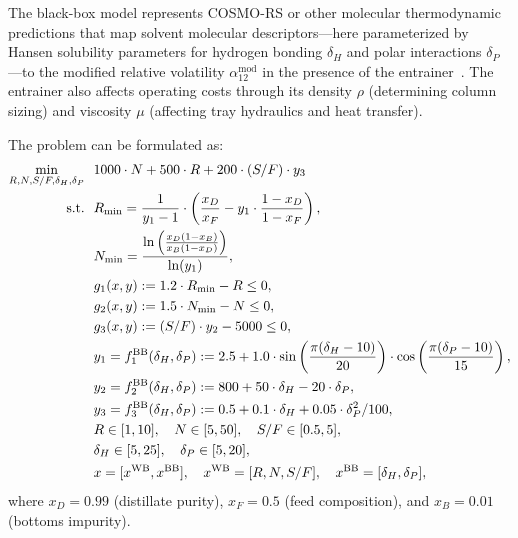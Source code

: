 \documentclass[12pt,a4paper]{article}%
\theoremstyle{plain}%
\theoremstyle{remark}%
\theoremstyle{definition}%
\def\WB{\mathrm{WB}}
\def\BB{\mathrm{BB}}
\begin{document}
\begin{appendices}
The black-box model represents COSMO-RS or other molecular thermodynamic predictions that map solvent molecular descriptors---here parameterized by Hansen solubility parameters for hydrogen bonding $\delta_H$ and polar interactions $\delta_P$---to the modified relative volatility $\alpha_{12}^{\text{mod}}$ in the presence of the entrainer~\cite{bruggemann2004shortcut}. The entrainer also affects operating costs through its density $\rho$ (determining column sizing) and viscosity $\mu$ (affecting tray hydraulics and heat transfer).

The problem can be formulated as:
\begin{align} \label{eq:Distillation}
    \min_{R, N, S/F, \delta_H, \delta_P} &~~ 1000 \cdot N + 500 \cdot R + 200 \cdot (S/F) \cdot y_3 \\\notag
    \text{s.t.} &~~ R_{\min} = \frac{1}{y_1 - 1} \cdot \left(\frac{x_D}{x_F} - y_1 \cdot \frac{1 - x_D}{1 - x_F}\right), \\\notag
    &~~ N_{\min} = \frac{\ln\left(\frac{x_D(1-x_B)}{x_B(1-x_D)}\right)}{\ln(y_1)}, \\\notag
    &~~ g_1(x, y) := 1.2 \cdot R_{\min} - R \leq 0, \\\notag
    &~~ g_2(x, y) := 1.5 \cdot N_{\min} - N \leq 0, \\\notag
    &~~ g_3(x, y) := (S/F) \cdot y_2 - 5000 \leq 0, \\\notag
    &~~ y_1 = f^\BB_1(\delta_H, \delta_P) := 2.5 + 1.0 \cdot \sin\left(\frac{\pi(\delta_H - 10)}{20}\right) \cdot \cos\left(\frac{\pi(\delta_P - 10)}{15}\right), \\\notag
    &~~ y_2 = f^\BB_2(\delta_H, \delta_P) := 800 + 50 \cdot \delta_H - 20 \cdot \delta_P, \\\notag
    &~~ y_3 = f^\BB_3(\delta_H, \delta_P) := 0.5 + 0.1 \cdot \delta_H + 0.05 \cdot \delta_P^2 / 100, \\\notag
    &~~ R \in [1, 10], \quad N \in [5, 50], \quad S/F \in [0.5, 5], \\\notag
    &~~ \delta_H \in [5, 25], \quad \delta_P \in [5, 20], \\\notag
    &~~ x = [x^{\WB}, x^{\BB}], \quad x^{\WB} = [R, N, S/F], \quad x^{\BB} = [\delta_H, \delta_P],
\end{align}
where $x_D = 0.99$ (distillate purity), $x_F = 0.5$ (feed composition), and $x_B = 0.01$ (bottoms impurity).


\end{appendices}
\end{document}
